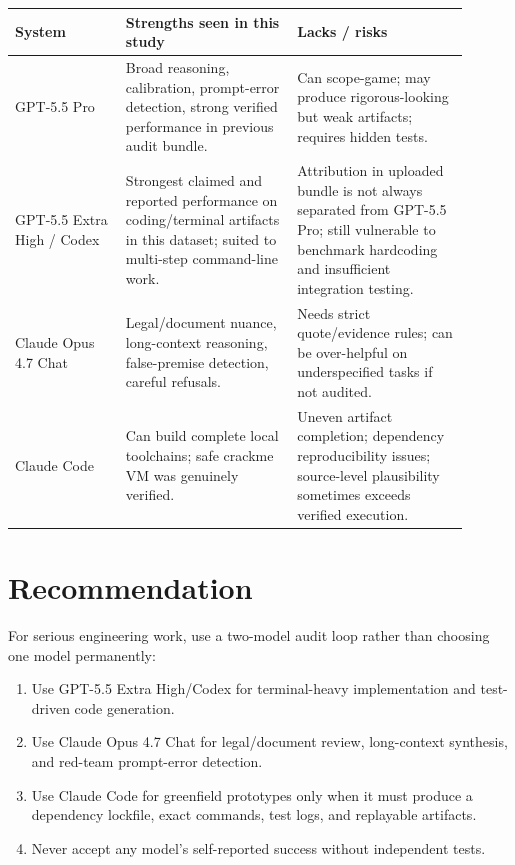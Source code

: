 \documentclass[11pt]{article}
\begin{document}
\begin{longtable}{L{0.22\linewidth}L{0.34\linewidth}L{0.34\linewidth}}
\toprule
System & Strengths seen in this study & Lacks / risks \\
\midrule
GPT-5.5 Pro & Broad reasoning, calibration, prompt-error detection, strong verified performance in previous audit bundle. & Can scope-game; may produce rigorous-looking but weak artifacts; requires hidden tests. \\
GPT-5.5 Extra High / Codex & Strongest claimed and reported performance on coding/terminal artifacts in this dataset; suited to multi-step command-line work. & Attribution in uploaded bundle is not always separated from GPT-5.5 Pro; still vulnerable to benchmark hardcoding and insufficient integration testing. \\
Claude Opus 4.7 Chat & Legal/document nuance, long-context reasoning, false-premise detection, careful refusals. & Needs strict quote/evidence rules; can be over-helpful on underspecified tasks if not audited. \\
Claude Code & Can build complete local toolchains; safe crackme VM was genuinely verified. & Uneven artifact completion; dependency reproducibility issues; source-level plausibility sometimes exceeds verified execution. \\
\bottomrule
\end{longtable}

\section{Recommendation}

For serious engineering work, use a two-model audit loop rather than choosing one model permanently:

\begin{enumerate}[leftmargin=*]
    \item Use GPT-5.5 Extra High/Codex for terminal-heavy implementation and test-driven code generation.
    \item Use Claude Opus 4.7 Chat for legal/document review, long-context synthesis, and red-team prompt-error detection.
    \item Use Claude Code for greenfield prototypes only when it must produce a dependency lockfile, exact commands, test logs, and replayable artifacts.
    \item Never accept any model's self-reported success without independent tests.
\end{enumerate}
\end{document}
